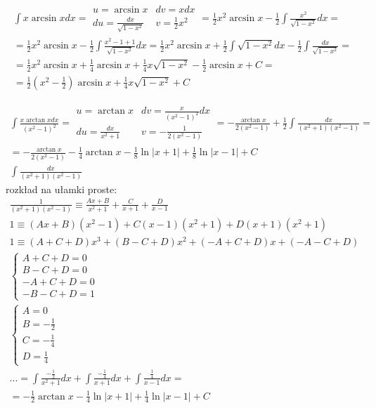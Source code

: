 \begin{gather*}\int x\arcsin x dx = \begin{array}{|ll|}
u=\arcsin x & dv=xdx \\
du=\frac{dx}{\sqrt{1-x^2}} & v=\frac{1}{2}x^2 \end{array} = \frac{1}{2}x^2\arcsin x-\frac{1}{2}\int \frac{x^2}{\sqrt{1-x^2}}dx =  \\
= \frac{1}{2}x^2\arcsin x-\frac{1}{2}\int \frac{x^2-1+1}{\sqrt{1-x^2}}dx = \frac{1}{2}x^2\arcsin x + \frac{1}{2}\int \sqrt{1-x^2}dx-\frac{1}{2}\int \frac{dx}{\sqrt{1-x^2}} =  \\
= \frac{1}{2}x^2\arcsin x + \frac{1}{4}\arcsin x+\frac{1}{4}x\sqrt{1-x^2}-\frac{1}{2}\arcsin x+C =  \\
= \frac{1}{2}(x^2-\frac{1}{2})\arcsin x+\frac{1}{4}x\sqrt{1-x^2}+C\end{gather*}



\begin{gather*}\int \frac{x\arctan x dx}{(x^2-1)^2} = \begin{array}{|ll|}
u=\arctan x & dv=\frac{x}{(x^2-1)^2}dx \\
du=\frac{dx}{x^2+1} & v=-\frac{1}{2(x^2-1)}
\end{array} = -\frac{\arctan x}{2(x^2-1)} + \frac{1}{2}\int \frac{dx}{(x^2+1)(x^2-1)} =  \\
= -\frac{\arctan x}{2(x^2-1)} - \frac{1}{4}\arctan x - \frac{1}{8}\ln|x+1| + \frac{1}{8}\ln|x-1|+C \\
\int \frac{dx}{(x^2+1)(x^2-1)}\end{gather*}
rozkład na ułamki proste:
\begin{gather*}\nonumber \frac{1}{(x^2+1)(x^2-1)} \equiv \frac{Ax+B}{x^2+1} + \frac{C}{x+1} + \frac{D}{x-1} \\
1 \equiv (Ax+B)(x^2-1)+C(x-1)(x^2+1)+D(x+1)(x^2+1) \\
1 \equiv (A+C+D)x^3+(B-C+D)x^2+(-A+C+D)x+(-A-C+D) \\
\begin{cases} A+C+D=0 \\ B-C+D=0 \\ -A+C+D=0 \\ -B-C+D=1 \end{cases} \\
\begin{cases} A=0 \\ B=-\frac{1}{2} \\ C=-\frac{1}{4} \\ D=\frac{1}{4} \end{cases} \\
... = \int \frac{-\frac{1}{2}}{x^2+1}dx + \int \frac{-\frac{1}{4}}{x+1}dx + \int \frac{\frac{1}{4}}{x-1}dx =  \\
= -\frac{1}{2}\arctan x -\frac{1}{4}\ln|x+1|+\frac{1}{4}\ln|x-1|+C\end{gather*}


